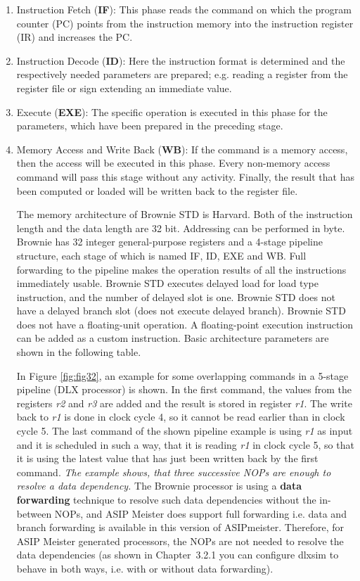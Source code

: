 \begin{enumerate}
\def\labelenumi{\arabic{enumi}.}
\item
  Instruction Fetch (\textbf{IF}): This phase reads the command on which
  the program counter (PC) points from the instruction memory into the
  instruction register (IR) and increases the PC.
\item
  Instruction Decode (\textbf{ID}): Here the instruction format is
  determined and the respectively needed parameters are prepared; e.g.
  reading a register from the register file or sign extending an
  immediate value.
\item
  Execute (\textbf{EXE}): The specific operation is executed in this
  phase for the parameters, which have been prepared in the preceding
  stage.
\item
  Memory Access and Write Back (\textbf{WB}): If the command is a memory
  access, then the access will be executed in this phase. Every
  non-memory access command will pass this stage without any activity.
  Finally, the result that has been computed or loaded will be written
  back to the register file.

  The memory architecture of Brownie STD is Harvard. Both of the
  instruction length and the data length are 32 bit. Addressing can be
  performed in byte. Brownie has 32 integer general-purpose registers
  and a 4-stage pipeline structure, each stage of which is named IF, ID,
  EXE and WB. Full forwarding to the pipeline makes the operation
  results of all the instructions immediately usable. Brownie STD
  executes delayed load for load type instruction, and the number of
  delayed slot is one. Brownie STD does not have a delayed branch slot
  (does not execute delayed branch). Brownie STD does not have a
  floating-unit operation. A floating-point execution instruction can be
  added as a custom instruction. Basic architecture parameters are shown
  in the following table.

  In Figure \ref{fig:fig32}, an example for some
  overlapping commands in a 5-stage pipeline (DLX processor) is shown.
  In the first command, the values from the registers \emph{r2} and
  \emph{r3} are added and the result is stored in register \emph{r1}.
  The write back to \emph{r1} is done in clock cycle 4, so it cannot be
  read earlier than in clock cycle 5. The last command of the shown
  pipeline example is using \emph{r1} as input and it is scheduled in
  such a way, that it is reading \emph{r1} in clock cycle 5, so that it
  is using the latest value that has just been written back by the first
  command. \emph{The example shows, that three successive NOPs are
  enough to resolve a data dependency.} The Brownie processor is using a
  \textbf{data forwarding} technique to resolve such data dependencies
  without the in-between NOPs, and ASIP Meister does support full
  forwarding i.e. data and branch forwarding is available in this
  version of ASIPmeister. Therefore, for ASIP Meister generated
  processors, the NOPs are not needed to resolve the data dependencies
  (as shown in Chapter~3.2.1 you can configure dlxsim to behave in both
  ways, i.e. with or without data forwarding).
\end{enumerate}
